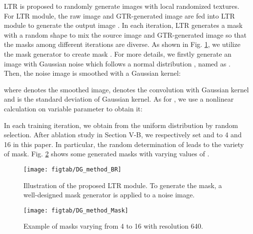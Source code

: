\documentclass[twocolumn,journal,vlined,ruled,linesnumbered]{IEEEtran}
\begin{document}
LTR is proposed to randomly generate images with local randomized textures. For LTR module, the raw image  and GTR-generated image  are fed into LTR module to generate the output image . In each iteration, LTR generates a mask  with a random shape to mix the source image and GTR-generated image so that the masks among different iterations are diverse. As shown in Fig. \ref{fig:An-illustration-of}, we utilize the mask generator \cite{french2019semi} to create mask . For more details, we firstly generate an image with Gaussian noise which follows a normal distribution , named as . Then, the noise image  is smoothed with a Gaussian kernel:


where  denotes the smoothed image,  denotes the convolution with  Gaussian kernel and  is the standard deviation of Gaussian kernel. As for , we use a nonlinear calculation on variable parameter  to obtain it:

\vspace{-2mm}



In each training iteration, we obtain  from the uniform distribution  by random selection. After ablation study in Section V-B, we respectively set  and  to 4 and 16 in this paper. In particular, the random determination of  leads to the variety of mask. Fig. \ref{fig:Example-masks-varying} shows some generated masks with varying values of .

\begin{figure}[t]
\begin{centering}
\texttt{[image: figtab/DG\_method\_BR]}
\par\end{centering}
\vspace{-2mm}
\caption{Illustration of the proposed LTR module. To generate the mask, a well-designed mask generator \cite{french2019semi} is applied to a noise image.\label{fig:An-illustration-of}}
\vspace{-2mm}
\end{figure}


\begin{figure}[t]
\begin{centering}
\texttt{[image: figtab/DG\_method\_Mask]}
\par\end{centering}
\vspace{-2mm}
\caption{Example of masks varying  from 4 to 16 with resolution 640.\label{fig:Example-masks-varying}}
\vspace{-4mm}
\end{figure}
\end{document}
